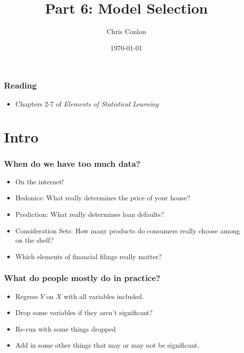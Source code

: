 \documentclass[xcolor=pdftex,dvipsnames,table,mathserif,aspectratio=169]{beamer}
\begin{document}
\title{Part 6: Model Selection}
\author{Chris Conlon}
\date{\today}

\frame{\titlepage}


\begin{frame}
\frametitle{Reading}
\begin{itemize}
\item Chapters 2-7 of \textit{Elements of Statistical Learning}
\end{itemize}

\end{frame}



\section{Intro}


\begin{frame}
\frametitle{When do we have too much data?}
\begin{itemize}
\item On the internet!
\item Hedonics: What really determines the price of your house?
\item Prediction: What really determines loan defaults?
\item Consideration Sets: How many products do consumers really choose among on the shelf?
\item Which elements of financial filings really matter?
\end{itemize}
\end{frame}


\begin{frame}
\frametitle{What do people mostly do in practice?}
\begin{itemize}
\item Regress $Y$ on $X$ with all variables included.
\item Drop some variables if they aren't significant?
\item Re-run with some things dropped
\item Add in some other things that may or may not be significant.
\end{itemize}
\end{frame}
\end{document}
